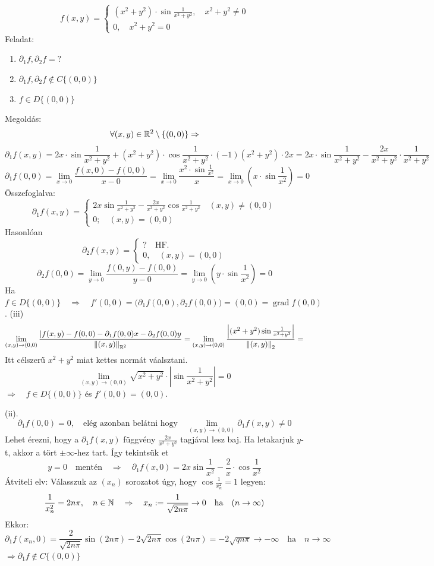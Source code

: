 \documentclass[a4paper,11.5pt]{article}
\DeclareMathOperator{\grad}{grad}
\newcommand{\norm}[1]{\left\lVert#1\right\rVert}
\begin{document}
	\begin{task}
		\[ f(x,y)=\begin{cases}
			(x^2+y^2)\cdot\sin\frac{1}{x^2+y^2},\quad x^2+y^2\not=0\\
			0,\quad x^2+y^2=0
		\end{cases} \]
		Feladat:
		\begin{enumerate}
			\item $\partial_1f, \partial_2f=?$
			\item $\partial_1f, \partial_2f\notin C\{(0,0)\}$
			\item $f\in D\{(0,0)\}$
		\end{enumerate}
		Megoldás: 
		\[ \forall(x,y)\in\mathbb{R}^2\setminus\{(0,0)\}\Rightarrow \]
		\[ \partial_1f(x,y)=2x\cdot\sin\frac{1}{x^2+y^2}+(x^2+y^2)\cdot\cos\frac{1}{x^2+y^2}\cdot(-1)(x^2+y^2)\cdot2x=2x\cdot\sin\frac{1}{x^2+y^2}-\frac{2x}{x^2+y^2}\cdot\frac{1}{x^2+y^2} \]
		\[ \partial_1f(0,0)=\lim_{x\to0}\frac{f(x,0)-f(0,0)}{x-0}=\lim_{x\to0}\frac{x^2\cdot\sin\frac{1}{x^2}}{x}=\lim_{x\to0}(x\cdot\sin\frac{1}{x^2})=0 \]
		Összefoglalva:
		\[ \partial_1f(x,y)=\begin{cases}
			2x\sin\frac{1}{x^2+y^2}-\frac{2x}{x^2+y^2}\cos\frac{1}{x^2+y^2}\quad (x,y)\not=(0,0)\\
			0;\quad (x,y)=(0,0)
		\end{cases} \]
		Hasonlóan
		\[ \partial_2f(x,y)=\begin{cases}
			?\quad \text{HF.}\\
			0,\quad (x,y)=(0,0)
		\end{cases} \]
		\[ \partial_2f(0,0)=\lim_{y\to0}\frac{f(0,y)-f(0,0)}{y-0}=\lim_{y\to0}(y\cdot\sin\frac{1}{x^2})=0 \]
		Ha $f\in D\{(0,0)\}\quad \Rightarrow\quad f'(0,0)=\big(\partial_1f(0,0),\partial_2f(0,0)\big) =(0,0)=\grad f(0,0)$.
		(iii)
		\[ \lim_{(x,y)\to(0,0)}\frac{|f(x,y)-f(0,0)-\partial_1f(0,0)x-\partial_2f(0,0)y}{\norm{(x,y)}_{\R^2} }=\lim_{(x,y)\to(0,0)}\frac{\left|(x^2+y^2)\sin\frac{1}{x^2+y^2}\right|}{\norm{(x,y)}_{2}}= \]
		Itt célszerű $x^2+y^2$ miat kettes normát váalsztani.
		\[ \lim_{(x,y)\to(0,0)}\sqrt{x^2+y^2}\cdot\left|\sin\frac{1}{x^2+y^2}\right|=0 \]
		$\Rightarrow\quad f\in D\{(0,0)\}$ és $f'(0,0)=(0,0)$.
		
		(ii). 
		\[ \partial_1f(0,0)=0,\quad \text{elég azonban belátni hogy}\quad \lim_{(x,y)\to(0,0)}\partial_1f(x,y)\not=0 \]
		Lehet érezni, hogy a $\partial_1f(x,y)$ függvény $\frac{2x}{x^2+y^2}$ tagjával lesz baj. Ha letakarjuk $y$-t, akkor a tört $\pm\infty$-hez tart. Így tekintsük et
		\[ y=0\quad \text{mentén}\quad \Rightarrow\quad \partial_1f(x,0)=2x\sin\frac{1}{x^2}-\frac{2}{x}\cdot\cos\frac{1}{x^2} \]
		Átviteli elv: Válasszuk az $(x_n)$ sorozatot úgy, hogy $\cos\frac{1}{x^2_n}=1$ legyen:
		\[ \frac{1}{x^2_n}=2n\pi,\quad n\in\mathbb{N}\quad \Rightarrow\quad x_n:=\frac{1}{\sqrt{2n\pi}}\to0\quad \text{ha}\quad (n\to\infty) \]
		Ekkor:
		\[ \partial_1f(x_n,0)=\frac{2}{\sqrt{2n\pi}}\sin(2n\pi)-2\sqrt{2n\pi}\cos(2n\pi)=-2\sqrt{qn\pi}\to-\infty\quad \text{ha}\quad n\to\infty \]
		$\Rightarrow \partial_1f\notin C\{(0,0)\}$
	\end{task}
\end{document}
